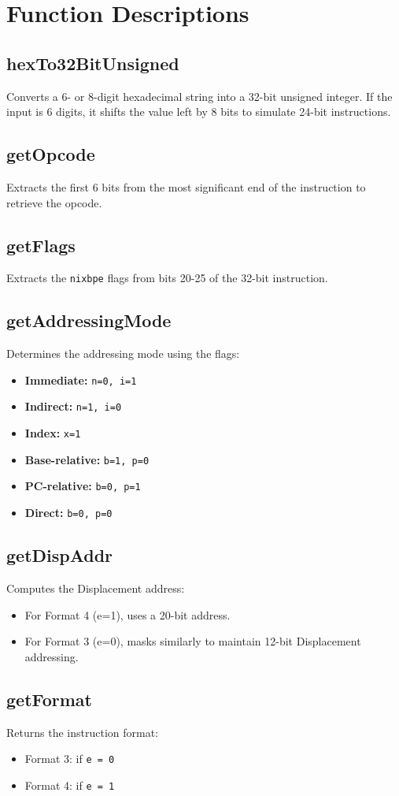 \documentclass[12pt]{article}
\begin{document}
\section{Function Descriptions}

\subsection{hexTo32BitUnsigned}
Converts a 6- or 8-digit hexadecimal string into a 32-bit unsigned integer. If the input is 6 digits, it shifts the value left by 8 bits to simulate 24-bit instructions.

\subsection{getOpcode}
Extracts the first 6 bits from the most significant end of the instruction to retrieve the opcode.

\subsection{getFlags}
Extracts the \texttt{nixbpe} flags from bits 20-25 of the 32-bit instruction.

\subsection{getAddressingMode}
Determines the addressing mode using the flags:
\begin{itemize}
    \item \textbf{Immediate:} \texttt{n=0, i=1}
    \item \textbf{Indirect:} \texttt{n=1, i=0}
    \item \textbf{Index:} \texttt{x=1}
    \item \textbf{Base-relative:} \texttt{b=1, p=0}
    \item \textbf{PC-relative:} \texttt{b=0, p=1}
    \item \textbf{Direct:} \texttt{b=0, p=0}
\end{itemize}

\subsection{getDispAddr}
Computes the Displacement address:
\begin{itemize}
    \item For Format 4 (e=1), uses a 20-bit address.
    \item For Format 3 (e=0), masks similarly to maintain 12-bit Displacement addressing.
\end{itemize}

\subsection{getFormat}
Returns the instruction format:
\begin{itemize}
    \item Format 3: if \texttt{e = 0}
    \item Format 4: if \texttt{e = 1}
\end{itemize}
\end{document}
